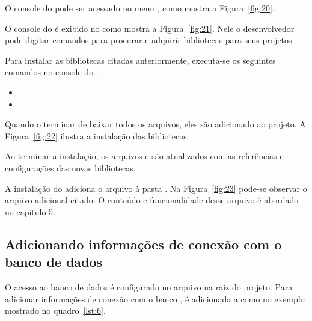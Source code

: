 O console do  pode ser acessado no menu , como mostra a Figura~\ref{fig:20}.


O console do  é exibido no  como mostra a Figura~\ref{fig:21}. Nele o desenvolvedor pode digitar comandos para procurar e adquirir bibliotecas para seus projetos.


Para instalar as bibliotecas citadas anteriormente, executa-se os seguintes comandos no console do :

\begin{itemize}
  \item {}
  \item {}
\end{itemize}

Quando o  terminar de baixar todos os arquivos, eles são adicionado ao projeto. A Figura~\ref{fig:22} ilustra a instalação das bibliotecas.


Ao terminar a instalação, os arquivos  e  são atualizados com as referências e configurações das novas bibliotecas.

A instalação do  adiciona o arquivo  à pasta . Na Figura~\ref{fig:23} pode-se observar o arquivo adicional citado. O conteúdo e funcionalidade desse arquivo é abordado no capitulo 5.


\subsection{Adicionando informações de conexão com o banco de dados}

O acesso ao banco de dados é configurado no arquivo  na raiz do projeto. Para adicionar informações de conexão com o banco , é adicionada a   como no exemplo mostrado no quadro~\ref{lst:6}.


